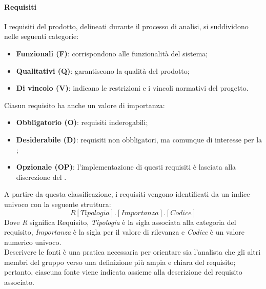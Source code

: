\paragraph{Requisiti}
I requisiti del prodotto, delineati durante il processo di analisi, si suddividono nelle seguenti categorie:
\begin{itemize}
  \item \textbf{Funzionali (F)}: corrispondono alle funzionalità del sistema;
  \item \textbf{Qualitativi (Q)}: garantiscono la qualità del prodotto;
  \item \textbf{Di vincolo (V)}: indicano le restrizioni e i vincoli normativi del progetto.
\end{itemize}
Ciasun requisito ha anche un valore di importanza:
\begin{itemize}
  \item \textbf{Obbligatorio (O)}: requisiti inderogabili;
  \item \textbf{Desiderabile (D)}: requisiti non obbligatori, ma comunque di interesse per la ;
  \item \textbf{Opzionale (OP)}: l'implementazione di questi requisiti è lasciata alla discrezione del .
\end{itemize}
A partire da questa classificazione, i requisiti vengono identificati da un indice univoco con la seguente struttura:
\[R[Tipologia].[Importanza].[Codice]\]
Dove \emph{R} significa Requisito, \emph{Tipologia} è la sigla associata alla categoria del requisito, \emph{Importanza} è la sigla per il valore di rilevanza e \emph{Codice} è un valore numerico univoco.\\
Descrivere le fonti è una pratica necessaria per orientare sia l'analista che gli altri membri del gruppo verso una definizione più ampia e chiara del requisito; pertanto, ciascuna fonte viene indicata assieme alla descrizione del requisito associato.


